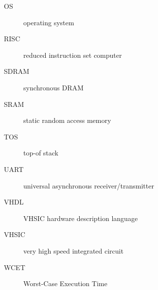 \documentclass[%
    10pt,
    headinclude, footexclude,
    openright, %
    notitlepage,
    cleardoubleempty,
    headsepline,
    pointlessnumbers,
    bibtotoc, idxtotoc,
    ]{scrbook}
\begin{document}
\begin{description}
\item [OS] operating system
\item [RISC] reduced instruction set computer
\item [SDRAM] synchronous DRAM
\item [SRAM] static random access memory
\item [TOS] top-of stack
\item [UART] universal asynchronous receiver/transmitter
\item [VHDL] VHSIC hardware description language
\item [VHSIC] very high speed integrated circuit
\item [WCET] Worst-Case Execution Time
\end{description}




\printindex
\end{document}

